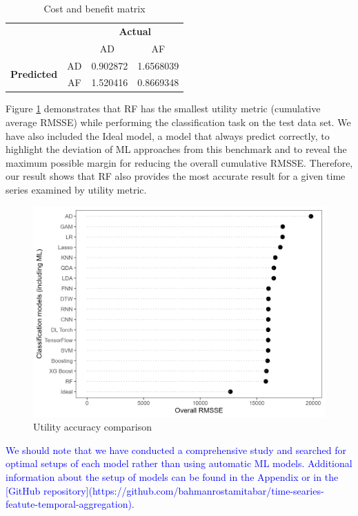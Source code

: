 \documentclass[preprint, 3p,
authoryear]{elsarticle} %
\begin{document}
\begin{table}
\caption{\label{tab:matrix}Cost and benefit matrix}
\centering
\begin{tabular}[t]{lccc}

\multicolumn{2}{c}{} & \multicolumn{2}{c}{\bf Actual}\\ 
\cline{3-4}
& & AD\  & AF\\
\hline
\multirow{2}{4em}{\bf Predicted} & AD & 0.902872 & 1.6568039\\
& AF & 1.520416 & 0.8669348\\
\hline
\end{tabular}
\end{table}

Figure \ref{fig:tableCB} demonstrates that RF has the smallest utility
metric (cumulative average RMSSE) while performing the classification
task on the test data set. We have also included the Ideal model, a
model that always predict correctly, to highlight the deviation of ML
approaches from this benchmark and to reveal the maximum possible margin
for reducing the overall cumulative RMSSE. Therefore, our result shows
that RF also provides the most accurate result for a given time series
examined by utility metric.

\begin{figure}[H]

{\centering \includegraphics[width=0.6\linewidth]{img/300dpi/utility} 

}

\caption{Utility accuracy comparison}\label{fig:tableCB}
\end{figure}

\textcolor{blue}{We should note that we have conducted a comprehensive study and searched for optimal setups of each model rather than using automatic ML models. Additional information about the setup of models can be found in the Appendix or in the [GitHub repository](https://github.com/bahmanrostamitabar/time-searies-featute-temporal-aggregation).}
\end{document}
